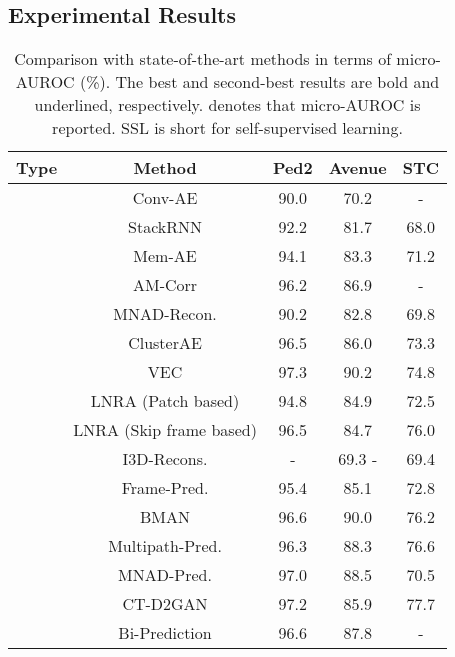 \documentclass[runningheads]{llncs}
\begin{document}
\subsection{Experimental Results}


\begin{table}[!t]
	\centering
	\caption{Comparison with state-of-the-art methods in terms of micro-AUROC (\%). The best and second-best results are bold and underlined, respectively.  denotes that micro-AUROC is reported. SSL is short for self-supervised learning.}
	\begin{adjustbox}{width=0.7\textwidth}
	\begin{threeparttable}
    	\begin{tabular}{c|c|ccc}
    		\hline
    		\textbf{Type}     & \textbf{Method}   & \textbf{Ped2} & \textbf{Avenue} & \textbf{STC} \\ \hline\hline
    		
    		\multirow{8}{*}{\rotatebox{90}{reconstruction}}
    		& Conv-AE \cite{hasan2016learning}       & 90.0 & 70.2 & -    \\ 
    		& StackRNN \cite{luo2017revisit}              & 92.2 & 81.7 & 68.0  \\ 
    		& Mem-AE \cite{gong2019memorizing}      & 94.1 & 83.3 & 71.2 \\
    		& AM-Corr \cite{nguyen2019anomaly}          & 96.2 & 86.9 & -    \\
    		& MNAD-Recon. \cite{park2020learning}        & 90.2 & 82.8 & 69.8 \\
    		& ClusterAE \cite{chang2020clustering}  & 96.5 & 86.0 & 73.3  \\
    		& VEC \cite{yu2020cloze}                & 97.3 & 90.2 & 74.8  \\
    		& LNRA (Patch based) \cite{astrid2021learning} & 94.8 & 84.9 & 72.5 \\
    		& LNRA (Skip frame based) \cite{astrid2021learning} & 96.5 & 84.7 & 76.0 \\
    		& I3D-Recons.                           & -   & 69.3 - & 69.4 \\
    		
    		\hline\hline
    		
    		
    		\multirow{6}{*}{\rotatebox{90}{prediction}}
    		& Frame-Pred. \cite{liu2018future}      & 95.4 & 85.1 & 72.8 \\
    		& BMAN \cite{lee2019bman}               & 96.6 & 90.0 & 76.2 \\
    		& Multipath-Pred. \cite{wang2021robust} & 96.3 & 88.3 & 76.6 \\
    		& MNAD-Pred. \cite{park2020learning}    & 97.0 & 88.5 & 70.5 \\
    		& CT-D2GAN \cite{feng2021Conv}          & 97.2 & 85.9 & 77.7 \\
    		& Bi-Prediction \cite{chen2020anomaly}  & 96.6 & 87.8 & - \\
 

\end{tabular}
\end{threeparttable}
\end{adjustbox}
\end{table}
\end{document}

